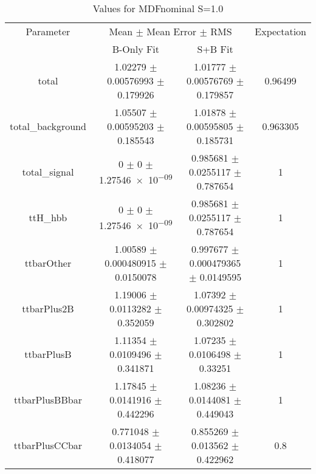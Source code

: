 \begin{table}
\centering
\caption{Values for MDFnominal S=1.0}
\begin{tabular}{cccc}
\toprule
Parameter & \multicolumn{2}{c}{Mean $\pm$ Mean Error $\pm$ RMS} & Expectation\\
 & B-Only Fit & S+B Fit & \\
\midrule
total & \num{1.02279} $\pm$ \num{0.00576993} $\pm$ \num{0.179926} & \num{1.01777} $\pm$ \num{0.00576769} $\pm$ \num{0.179857} & \num{0.96499}\\
total\_background & \num{1.05507} $\pm$ \num{0.00595203} $\pm$ \num{0.185543} & \num{1.01878} $\pm$ \num{0.00595805} $\pm$ \num{0.185731} & \num{0.963305}\\
total\_signal & \num{0} $\pm$ \num{0} $\pm$ \num{1.27546e-09} & \num{0.985681} $\pm$ \num{0.0255117} $\pm$ \num{0.787654} & \num{1}\\
ttH\_hbb & \num{0} $\pm$ \num{0} $\pm$ \num{1.27546e-09} & \num{0.985681} $\pm$ \num{0.0255117} $\pm$ \num{0.787654} & \num{1}\\
ttbarOther & \num{1.00589} $\pm$ \num{0.000480915} $\pm$ \num{0.0150078} & \num{0.997677} $\pm$ \num{0.000479365} $\pm$ \num{0.0149595} & \num{1}\\
ttbarPlus2B & \num{1.19006} $\pm$ \num{0.0113282} $\pm$ \num{0.352059} & \num{1.07392} $\pm$ \num{0.00974325} $\pm$ \num{0.302802} & \num{1}\\
ttbarPlusB & \num{1.11354} $\pm$ \num{0.0109496} $\pm$ \num{0.341871} & \num{1.07235} $\pm$ \num{0.0106498} $\pm$ \num{0.33251} & \num{1}\\
ttbarPlusBBbar & \num{1.17845} $\pm$ \num{0.0141916} $\pm$ \num{0.442296} & \num{1.08236} $\pm$ \num{0.0144081} $\pm$ \num{0.449043} & \num{1}\\
ttbarPlusCCbar & \num{0.771048} $\pm$ \num{0.0134054} $\pm$ \num{0.418077} & \num{0.855269} $\pm$ \num{0.013562} $\pm$ \num{0.422962} & \num{0.8}\\
\bottomrule
\end{tabular}
\end{table}